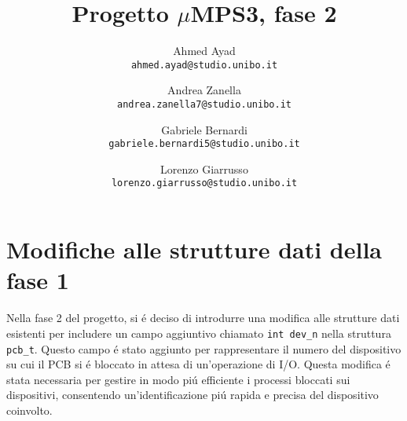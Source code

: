 \documentclass[a4paper]{article}
\title{Progetto $\mu$MPS3, fase 2}
\author{
 Ahmed Ayad\\
  \texttt{ahmed.ayad@studio.unibo.it}
  \and
  Andrea Zanella\\
  \texttt{andrea.zanella7@studio.unibo.it}
  \and
  Gabriele Bernardi\\
  \texttt{gabriele.bernardi5@studio.unibo.it}
  \and
  Lorenzo Giarrusso\\
  \texttt{lorenzo.giarrusso@studio.unibo.it}
}
\begin{document}
\maketitle
\pagebreak
\tableofcontents

\section{Modifiche alle strutture dati della fase 1}
Nella fase 2 del progetto, si \'e deciso di introdurre una modifica alle strutture dati esistenti per includere un campo aggiuntivo chiamato \verb+int dev_n+ nella struttura \verb+pcb_t+. Questo campo \'e stato aggiunto per rappresentare il numero del dispositivo su cui il PCB si \'e bloccato in attesa di un'operazione di I/O. Questa modifica \'e stata necessaria per gestire in modo pi\'u efficiente i processi bloccati sui dispositivi, consentendo un'identificazione pi\'u rapida e precisa del dispositivo coinvolto.
\end{document}
